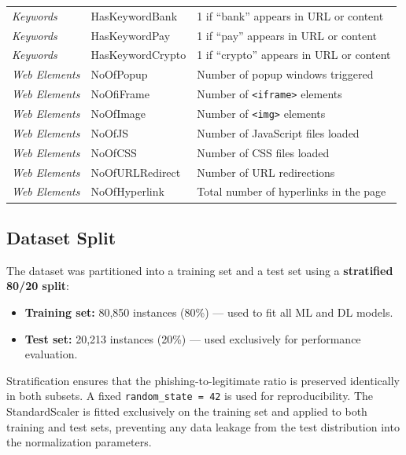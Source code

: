 \begin{table}[H]
\begin{tabular}{|l|l|p{7cm}|}
\hline
\textit{Keywords} & HasKeywordBank & 1 if ``bank'' appears in URL or content \\
\textit{Keywords} & HasKeywordPay & 1 if ``pay'' appears in URL or content \\
\textit{Keywords} & HasKeywordCrypto & 1 if ``crypto'' appears in URL or content \\
\hline
\textit{Web Elements} & NoOfPopup & Number of popup windows triggered \\
\textit{Web Elements} & NoOfiFrame & Number of \texttt{<iframe>} elements \\
\textit{Web Elements} & NoOfImage & Number of \texttt{<img>} elements \\
\textit{Web Elements} & NoOfJS & Number of JavaScript files loaded \\
\textit{Web Elements} & NoOfCSS & Number of CSS files loaded \\
\textit{Web Elements} & NoOfURLRedirect & Number of URL redirections \\
\textit{Web Elements} & NoOfHyperlink & Total number of hyperlinks in the page \\
\hline
\end{tabular}
\end{table}

\subsection{Dataset Split}
\label{subsec:split}

The dataset was partitioned into a training set and a test set using a \textbf{stratified 80/20 split}:

\begin{itemize}
    \item \textbf{Training set:} 80,850 instances (80\%) — used to fit all ML and DL models.
    \item \textbf{Test set:} 20,213 instances (20\%) — used exclusively for performance evaluation.
\end{itemize}

Stratification ensures that the phishing-to-legitimate ratio is preserved identically in both subsets. A fixed \texttt{random\_state = 42} is used for reproducibility. The StandardScaler is fitted exclusively on the training set and applied to both training and test sets, preventing any data leakage from the test distribution into the normalization parameters.

